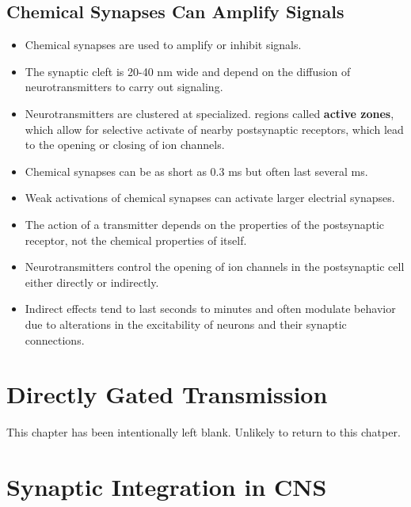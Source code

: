 \documentclass[12pt,a4paper]{article}
\begin{document}
\subsection{Chemical Synapses Can Amplify Signals}
\begin{itemize}
    \item Chemical synapses are used to amplify or inhibit signals. 
    \item The synaptic cleft is 20-40 nm wide and depend on the diffusion of neurotransmitters to carry out signaling.
    \item Neurotransmitters are clustered at specialized. regions called \textbf{active zones}, which allow for selective activate of nearby postsynaptic receptors, which lead to the opening or closing of ion channels.
    \item Chemical synapses can be as short as 0.3 ms but often last several ms.
    \item Weak activations of chemical synapses can activate larger electrial synapses. 
    \item The action of a transmitter depends on the properties of the postsynaptic receptor, not the chemical properties of itself.
    \item Neurotransmitters control the opening of ion channels in the postsynaptic cell either directly or indirectly.
    \item Indirect effects tend to last seconds to minutes and often modulate behavior due to alterations in the excitability of neurons and their synaptic connections.
\end{itemize}

\clearpage
\section{Directly Gated Transmission}   
    This chapter has been intentionally left blank. Unlikely to return to this chatper.

\clearpage
\section{Synaptic Integration in CNS}
\end{document}

